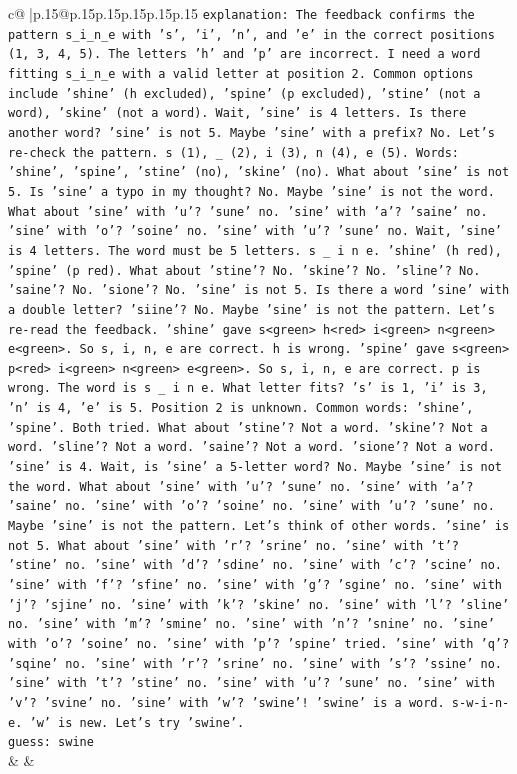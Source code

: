 \documentclass{article}
\begin{document}
{\begin{supertabular}{c@{$\;$}|p{.15\linewidth}@{}p{.15\linewidth}p{.15\linewidth}p{.15\linewidth}p{.15\linewidth}p{.15\linewidth}}
{{{                \texttt{explanation: The feedback confirms the pattern s\_i\_n\_e with 's', 'i', 'n', and 'e' in the correct positions (1, 3, 4, 5). The letters 'h' and 'p' are incorrect. I need a word fitting s\_i\_n\_e with a valid letter at position 2. Common options include 'shine' (h excluded), 'spine' (p excluded), 'stine' (not a word), 'skine' (not a word). Wait, 'sine' is 4 letters. Is there another word? 'sine' is not 5. Maybe 'sine' with a prefix? No. Let's re{-}check the pattern. s (1), \_ (2), i (3), n (4), e (5). Words: 'shine', 'spine', 'stine' (no), 'skine' (no). What about 'sine' is not 5. Is 'sine' a typo in my thought? No. Maybe 'sine' is not the word. What about 'sine' with 'u'? 'sune' no. 'sine' with 'a'? 'saine' no. 'sine' with 'o'? 'soine' no. 'sine' with 'u'? 'sune' no. Wait, 'sine' is 4 letters. The word must be 5 letters. s \_ i n e. 'shine' (h red), 'spine' (p red). What about 'stine'? No. 'skine'? No. 'sline'? No. 'saine'? No. 'sione'? No. 'sine' is not 5. Is there a word 'sine' with a double letter? 'siine'? No. Maybe 'sine' is not the pattern. Let's re{-}read the feedback. 'shine' gave s<green> h<red> i<green> n<green> e<green>. So s, i, n, e are correct. h is wrong. 'spine' gave s<green> p<red> i<green> n<green> e<green>. So s, i, n, e are correct. p is wrong. The word is s \_ i n e. What letter fits? 's' is 1, 'i' is 3, 'n' is 4, 'e' is 5. Position 2 is unknown. Common words: 'shine', 'spine'. Both tried. What about 'stine'? Not a word. 'skine'? Not a word. 'sline'? Not a word. 'saine'? Not a word. 'sione'? Not a word. 'sine' is 4. Wait, is 'sine' a 5{-}letter word? No. Maybe 'sine' is not the word. What about 'sine' with 'u'? 'sune' no. 'sine' with 'a'? 'saine' no. 'sine' with 'o'? 'soine' no. 'sine' with 'u'? 'sune' no. Maybe 'sine' is not the pattern. Let's think of other words. 'sine' is not 5. What about 'sine' with 'r'? 'srine' no. 'sine' with 't'? 'stine' no. 'sine' with 'd'? 'sdine' no. 'sine' with 'c'? 'scine' no. 'sine' with 'f'? 'sfine' no. 'sine' with 'g'? 'sgine' no. 'sine' with 'j'? 'sjine' no. 'sine' with 'k'? 'skine' no. 'sine' with 'l'? 'sline' no. 'sine' with 'm'? 'smine' no. 'sine' with 'n'? 'snine' no. 'sine' with 'o'? 'soine' no. 'sine' with 'p'? 'spine' tried. 'sine' with 'q'? 'sqine' no. 'sine' with 'r'? 'srine' no. 'sine' with 's'? 'ssine' no. 'sine' with 't'? 'stine' no. 'sine' with 'u'? 'sune' no. 'sine' with 'v'? 'svine' no. 'sine' with 'w'? 'swine'! 'swine' is a word. s{-}w{-}i{-}n{-}e. 'w' is new. Let's try 'swine'.} \\
\texttt{guess: swine} \\
            }
        }
    }
    & & \\ \\


\end{supertabular}}
\end{document}

